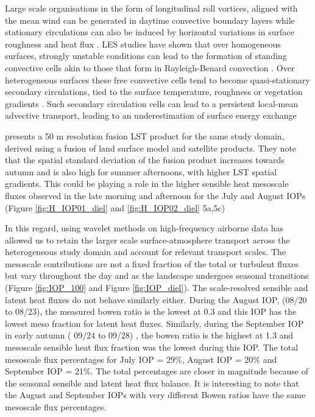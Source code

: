 \documentclass[draft]{agujournal2019}
\begin{document}
Large scale organisations in the form of longitudinal roll vortices, aligned with the mean wind can be generated in daytime convective boundary layers \cite{etling_roll_1993} while stationary circulations can also be induced by horizontal variations in surface roughness and heat flux \cite{desjardins_scaling_1997, sun_transport_1998}. LES studies have shown that over homogeneous surfaces, strongly unstable conditions can lead to the formation of standing convective cells akin to those that form in Rayleigh-Benard convection  \cite{kanda_les_2004, de_roo_influence_2018}. Over heterogeneous surfaces these free convective cells tend to become quasi-stationary secondary circulations, tied to the surface temperature, roughness or vegetation gradients \cite{inagaki_impact_2006, maronga_large-eddy_2013}. Such secondary circulation cells can lead to a persistent local-mean advective transport, leading to an underestimation of surface energy exchange \cite{morrison_impact_2021}

\cite{desai_multisensor_2021} presents a 50 m resolution fusion LST product for the same study domain, derived using a fusion of land surface model and satellite products. They note that the spatial standard deviation of the fusion product increases towards autumn and is also high for summer afternoons, with higher LST spatial gradients. This could be playing a role in the higher sensible heat mesoscale fluxes observed in the late morning and afternoon for the July and August IOPs (Figure \ref{fig:H_IOP01_diel} and \ref{fig:H_IOP02_diel} 5a,5c)

In this regard, using wavelet methods on high-frequency airborne data has allowed us to retain the larger scale surface-atmosphere transport across the heterogeneous study domain and account for relevant transport scales. The mesoscale contributions are not a fixed fraction of the total or turbulent fluxes but vary throughout the day and as the landscape undergoes seasonal transitions (Figure \ref{fig:IOP_100} and Figure \ref{fig:IOP_diel}). The scale-resolved sensible and latent heat fluxes do not behave similarly either. During the August IOP, (08/20 to 08/23), the measured bowen ratio is the lowest at 0.3 and this IOP has the lowest meso fraction for latent heat fluxes. Similarly, during the September IOP in early autumn ( 09/24 to 09/28) , the bowen ratio is the highest at 1.3 and mesoscale sensible heat flux fraction was the lowest during this IOP. The total mesoscale flux percentages for July IOP = 29\%, August IOP = 20\% and September IOP = 21\%. The total percentages are closer in magnitude because of the seasonal sensible and latent heat flux balance.  It is interesting to note that the August and September IOPs with very different Bowen ratios have the same mesoscale flux percentages.
\end{document}
